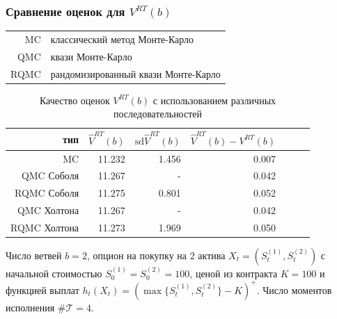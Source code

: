 \documentclass[unicode, notheorems]{beamer}
\newcommand{\Tau}{\ensuremath{\mathcal{T}}}
\newcommand{\Vhat}{\hat{V}}
\begin{document}
\begin{frame}[t]\frametitle{Сравнение оценок для $V^{RT}(b)$}

\begin{tabular}{rl}
MC & \parbox{0.8\textwidth}{классический метод Монте-Карло}\\
QMC & \parbox{0.8\textwidth}{квази Монте-Карло}\\
RQMC & \parbox{0.8\textwidth}{рандомизированный квази Монте-Карло}
\end{tabular}

\begin{table}
  \caption{Качество оценок $V^{RT}(b)$ с использованием различных последовательностей}
  \label{tab:random_tree}
  \centering

  \begin{tabular}{rrrrrrr}
  тип&$\Vhat^{RT}(b)$&$\mathrm{sd}\Vhat^{RT}(b)$&$\Vhat^{RT}(b) - V^{RT}(b)$\\\hline
  MC&11.232&1.456&0.007\\[2pt]
  QMC Соболя&11.267&-&0.042\\
  RQMC Соболя&11.275&\textcolor{beamer@blendedblue}{0.801}&0.052\\[2pt]
  QMC Холтона&11.267&-&0.042\\
  RQMC Холтона&11.273&1.969&0.050\\[2pt]
  \end{tabular}

   \linespread{0.7}\footnotesize Число ветвей $b=2$, опцион на покупку на 2 актива $X_t = (S^{(1)}_t, S^{(2)}_t)$ с начальной стоимостью $S^{(1)}_0 = S^{(2)}_0 = 100$, ценой из контракта $K = 100$ и функцией выплат $h_t(X_t) = (\max\{S^{(1)}_t, S^{(2)}_t\} - K)^+$. Число моментов исполнения $\#\Tau = 4$.
\end{table}

\end{frame}
\end{document}
